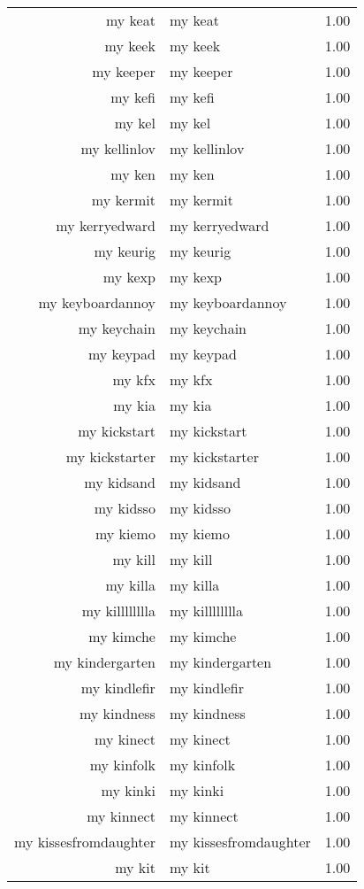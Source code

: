 \begin{table}[ht]
\begin{tabular}{rlr}
  my keat & my keat & 1.00 \\ 
  my keek & my keek & 1.00 \\ 
  my keeper & my keeper & 1.00 \\ 
  my kefi & my kefi & 1.00 \\ 
  my kel & my kel & 1.00 \\ 
  my kellinlov & my kellinlov & 1.00 \\ 
  my ken & my ken & 1.00 \\ 
  my kermit & my kermit & 1.00 \\ 
  my kerryedward & my kerryedward & 1.00 \\ 
  my keurig & my keurig & 1.00 \\ 
  my kexp & my kexp & 1.00 \\ 
  my keyboardannoy & my keyboardannoy & 1.00 \\ 
  my keychain & my keychain & 1.00 \\ 
  my keypad & my keypad & 1.00 \\ 
  my kfx & my kfx & 1.00 \\ 
  my kia & my kia & 1.00 \\ 
  my kickstart & my kickstart & 1.00 \\ 
  my kickstarter & my kickstarter & 1.00 \\ 
  my kidsand & my kidsand & 1.00 \\ 
  my kidsso & my kidsso & 1.00 \\ 
  my kiemo & my kiemo & 1.00 \\ 
  my kill & my kill & 1.00 \\ 
  my killa & my killa & 1.00 \\ 
  my killlllllla & my killlllllla & 1.00 \\ 
  my kimche & my kimche & 1.00 \\ 
  my kindergarten & my kindergarten & 1.00 \\ 
  my kindlefir & my kindlefir & 1.00 \\ 
  my kindness & my kindness & 1.00 \\ 
  my kinect & my kinect & 1.00 \\ 
  my kinfolk & my kinfolk & 1.00 \\ 
  my kinki & my kinki & 1.00 \\ 
  my kinnect & my kinnect & 1.00 \\ 
  my kissesfromdaughter & my kissesfromdaughter & 1.00 \\ 
  my kit & my kit & 1.00 \\ 

\end{tabular}
\end{table}
